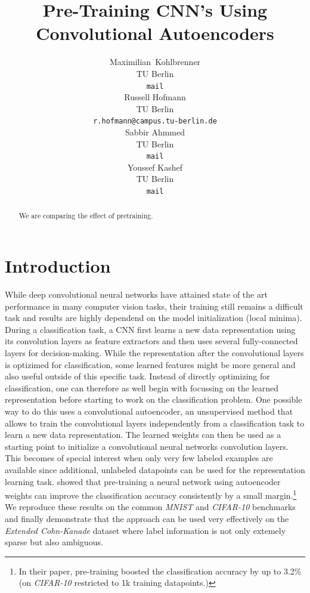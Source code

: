 \documentclass{article}
\title{Pre-Training CNN's Using Convolutional Autoencoders}
\author{
  Maximilian~Kohlbrenner\\
  TU Berlin\\
  \texttt{mail} \\
  \And
  Russell Hofmann\\
  TU Berlin\\
  \texttt{r.hofmann@campus.tu-berlin.de} \\
  \AND
  Sabbir Ahmmed \\
  TU Berlin \\
  \texttt{mail}\\
  \And
  Youssef Kashef \\
  TU Berlin \\
  \texttt{mail}
}
\begin{document}

\maketitle

\begin{abstract}
  We are comparing the effect of pretraining.
\end{abstract}


\section{Introduction}
  While deep convolutional neural networks have attained state of the art performance in many computer vision tasks, their training still remains a difficult task and results are highly dependend on the model initialization (local minima). 
  During a classification task, a CNN first learns a new data representation using its convolution layers as feature extractors and then uses several fully-connected layers for decision-making. 
  While the representation after the convolutional layers is optizimed for classification, some learned features might be more general and also useful outside of this specific task. 
  Instead of directly optimizing for classification, one can therefore as well begin with focussing on the learned representation before starting to work on the classification problem.
  One possible way to do this uses a convolutional autoencoder, an unsupervised method that allows to train the convolutional layers independently from a classification task to learn a new data representation. 
  The learned weights can then be used as a starting point to initialize a convolutional neural networks convolution layers. 
  This becomes of special interest when only very few labeled examples are available since additional, unlabeled datapoints can be used for the representation learning task. 
  \citep{masci11} showed that pre-training a neural network using autoencoder weights can improve the classification accuracy consistently by a small margin.\footnote{In their paper, pre-training boosted the classification accuracy by up to 3.2\% (on \emph{CIFAR-10} restricted to 1k training datapoints.)}
  We reproduce these results on the common \emph{MNIST} \citep{lecun1998mnist} and \emph{CIFAR-10} \citep{krizhevsky2009learning} benchmarks and finally demonstrate that the approach can be used very effectively on the \emph{Extended Cohn-Kanade} \citep{kanade2000comprehensive,lucey2010extended} dataset where label information is not only extemely sparse but also ambiguous. 
\end{document}

